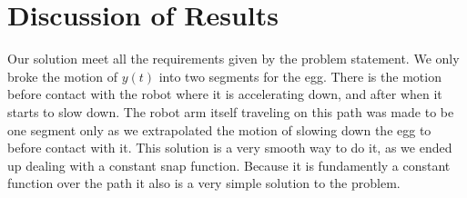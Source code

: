 \documentclass{article}
\begin{document}
	\section*{Discussion of Results}
	
	\tab Our solution meet all the requirements given by the problem statement. We only broke the motion of $y\left(t\right)$ into two segments for the egg. There is the motion before contact with the robot where it is accelerating down, and after when it starts to slow down. The robot arm itself traveling on this path was made to be one segment only as we extrapolated the motion of slowing down the egg to before contact with it. This solution is a very smooth way to do it, as we ended up dealing with a constant snap function. Because it is fundamently a constant function over the path it also is a very simple solution to the problem.
	
\end{document}
